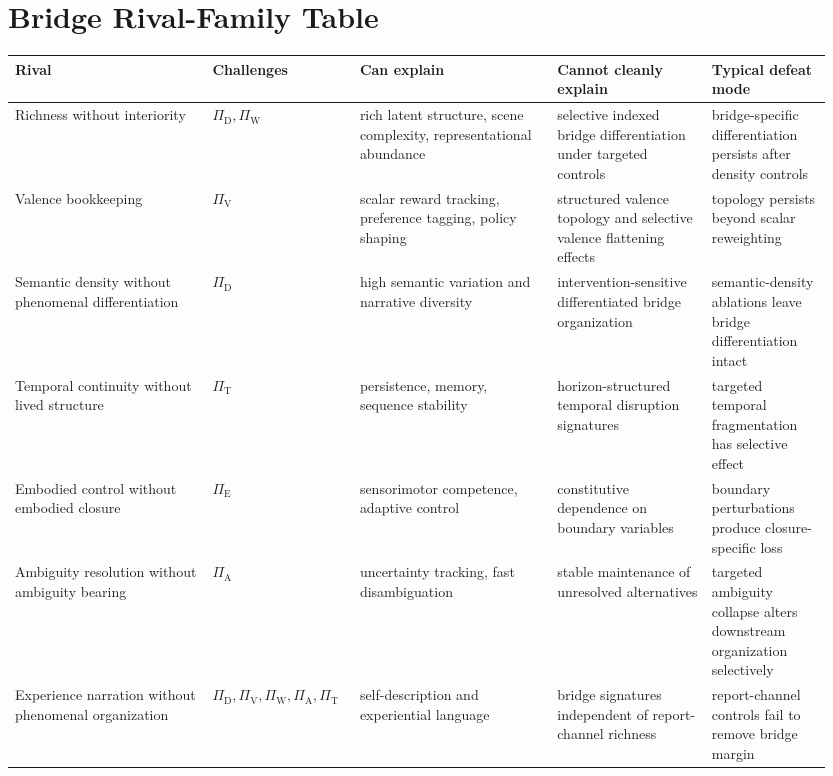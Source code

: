 \documentclass[11pt,a4paper]{article}
\theoremstyle{definition}
\newcommand{\PiD}{\Pi_{\mathrm{D}}}
\newcommand{\PiV}{\Pi_{\mathrm{V}}}
\newcommand{\PiW}{\Pi_{\mathrm{W}}}
\newcommand{\PiA}{\Pi_{\mathrm{A}}}
\newcommand{\PiE}{\Pi_{\mathrm{E}}}
\newcommand{\PiT}{\Pi_{\mathrm{T}}}
\begin{document}
\section{Bridge Rival-Family Table}
\begin{center}
\small
\begin{tabularx}{\linewidth}{@{}p{0.23\linewidth}p{0.17\linewidth}p{0.23\linewidth}p{0.18\linewidth}p{0.14\linewidth}@{}}
\toprule
Rival & Challenges & Can explain & Cannot cleanly explain & Typical defeat mode \\
\midrule
Richness without interiority & $\PiD,\PiW$ & rich latent structure, scene complexity, representational abundance & selective indexed bridge differentiation under targeted controls & bridge-specific differentiation persists after density controls \\
Valence bookkeeping & $\PiV$ & scalar reward tracking, preference tagging, policy shaping & structured valence topology and selective valence flattening effects & topology persists beyond scalar reweighting \\
Semantic density without phenomenal differentiation & $\PiD$ & high semantic variation and narrative diversity & intervention-sensitive differentiated bridge organization & semantic-density ablations leave bridge differentiation intact \\
Temporal continuity without lived structure & $\PiT$ & persistence, memory, sequence stability & horizon-structured temporal disruption signatures & targeted temporal fragmentation has selective effect \\
Embodied control without embodied closure & $\PiE$ & sensorimotor competence, adaptive control & constitutive dependence on boundary variables & boundary perturbations produce closure-specific loss \\
Ambiguity resolution without ambiguity bearing & $\PiA$ & uncertainty tracking, fast disambiguation & stable maintenance of unresolved alternatives & targeted ambiguity collapse alters downstream organization selectively \\
Experience narration without phenomenal organization & $\PiD,\PiV,\PiW,\PiA,\PiT$ & self-description and experiential language & bridge signatures independent of report-channel richness & report-channel controls fail to remove bridge margin \\
\bottomrule
\end{tabularx}
\end{center}
\end{document}
